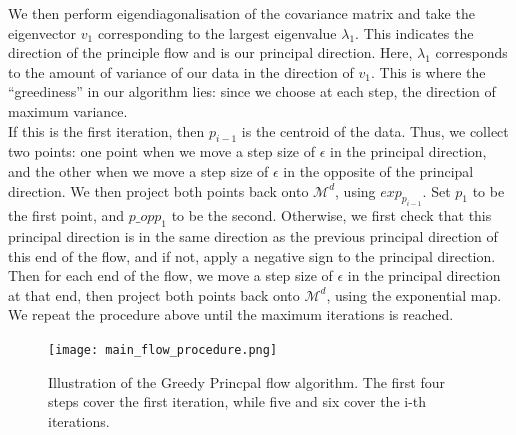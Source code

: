 \documentclass[12pt]{report}
\begin{document}
We then perform eigendiagonalisation of the covariance matrix and 
take the eigenvector $v_1$ corresponding to the largest eigenvalue $\lambda_1$. 
This indicates the direction of the principle flow 
and is our principal direction. Here, $\lambda_1$ corresponds to the amount
of variance of our data in the direction of $v_1$.
This is where the ``greediness'' in 
our algorithm lies: since we choose at each step, the direction of maximum 
variance.\\
If this is the first iteration, then $p_{i-1}$ is the centroid of the data.
Thus, we collect two points: 
one point when we move a step size of $\epsilon$ in the principal direction, 
and the other when we move a step size of $\epsilon$ in the 
opposite of the principal direction. We then project both points back onto 
$\mathcal{M}^d$, using $exp_{p_{i-1}}$. 
Set $p_1$ to be the first point, and $p\_opp_1$ to be the second. 
Otherwise, we first check that this principal direction is in the same 
direction as the previous principal direction of this end of the flow, 
and if not, apply a negative sign to the principal direction. 
Then for each end of the flow,
we move a step size of $\epsilon$ in the principal direction
at that end, then project both points back onto 
$\mathcal{M}^d$, using the exponential map.\\
We repeat the procedure above until the maximum iterations is reached.
\newpage
\begin{figure}[ht]
    \begin{center}
        \texttt{[image: main\_flow\_procedure.png]}
        \caption{Illustration of the Greedy Princpal flow algorithm. 
        The first four steps cover the first iteration, while five and 
        six cover the i-th iterations.}
        \label{fig:Greedy Principal Flow Procedure}
    \end{center}
\end{figure}
\end{document}
